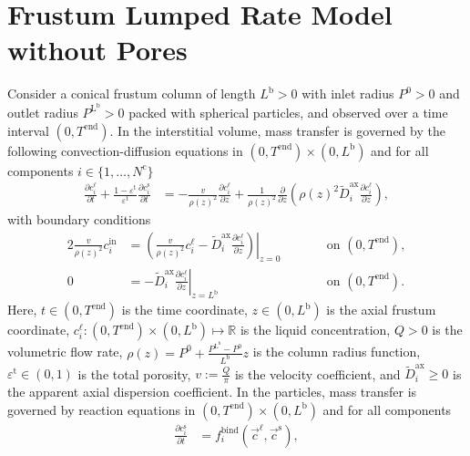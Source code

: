 \documentclass{article}
\begin{document}
\section*{Frustum Lumped Rate Model without Pores}
Consider a conical frustum column of length $L^{\mathrm{b}} > 0$ with inlet radius $P^{\mathrm{0}} > 0$ and outlet radius $P^{\mathrm{L^{\mathrm{b}}}} > 0$ packed with spherical particles, and observed over a time interval $(0, T^{\mathrm{end}})$.
In the interstitial volume, mass transfer is governed by the following convection-diffusion equations in $(0, T^{\mathrm{end}})\times (0, L^{\mathrm{b}})$ and for all components $i\in\{1, \dots, N^{\mathrm{c}} \}$
\begin{align}
    \frac{\partial c^{\mathrm{\ell}}_{i}}{\partial t}
        + \frac{1 - \varepsilon^{\mathrm{t}}}{\varepsilon^{\mathrm{t}}} \frac{\partial c^{\mathrm{s}}_{i}}{\partial t}
    &= - \frac{v}{\rho(z)^{2}} \frac{\partial c^{\mathrm{\ell}}_{i}}{\partial z}
        + \frac{1}{\rho(z)^{2}} \frac{\partial}{\partial z} \left( \rho(z)^{2} \tilde{D}^{\mathrm{ax}}_{i} \frac{\partial c^{\mathrm{\ell}}_{i}}{\partial z} \right),
\end{align}
with boundary conditions
\begin{alignat}{2}
    \frac{v}{\rho(z)^{2}} c^{\mathrm{in}}_{i}
    &= \left.\left( \frac{v}{\rho(z)^{2}} c^{\mathrm{\ell}}_{i} - \tilde{D}^{\mathrm{ax}}_{i} \frac{\partial c^{\mathrm{\ell}}_{i}}{\partial z}\right)\right|_{z=0}
    & & \qquad\text{on }(0, T^{\mathrm{end}}),
    \\
    0
    &= - \tilde{D}^{\mathrm{ax}}_{i} \left. \frac{\partial c^{\mathrm{\ell}}_{i}}{\partial z} \right|_{z=L^{\mathrm{b}}}
    & & \qquad\text{on }(0, T^{\mathrm{end}}).
\end{alignat}
Here, $t\in (0, T^{\mathrm{end}})$ is the time coordinate, $z\in (0, L^{\mathrm{b}})$ is the axial frustum coordinate, $c^{\mathrm{\ell}}_{i}\colon (0, T^{\mathrm{end}})\times (0, L^{\mathrm{b}}) \mapsto \mathbb{R}$ is the liquid concentration, $Q> 0$ is the volumetric flow rate, $\rho(z) = P^{\mathrm{0}} + \frac{P^{\mathrm{L^{\mathrm{b}}}} - P^{\mathrm{0}}}{L^{\mathrm{b}}} z$ is the column radius function, $\varepsilon^{\mathrm{t}}\in (0, 1)$ is the total porosity, $v:= \frac{Q}{\pi}$ is the velocity coefficient, and $\tilde{D}^{\mathrm{ax}}_{i}\geq 0$ is the apparent axial dispersion coefficient.
In the particles, mass transfer is governed by reaction equations in $(0, T^{\mathrm{end}}) \times (0, L^{\mathrm{b}})$ and for all components
\begin{align}
    \frac{\partial c^{\mathrm{s}}_{i}}{\partial t}
    &= f^{\mathrm{bind}}_{i}\left( \vec{c}^{\mathrm{\ell}}, \vec{c}^{\mathrm{s}} \right),
\end{align}
\end{document}
